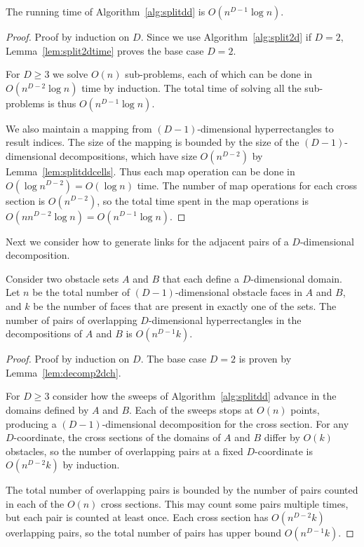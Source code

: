 \documentclass[english,gradu]{tktltiki2018}
\begin{document}
\begin{lem}\label{lem:splitddtime}The running time of Algorithm~\ref{alg:splitdd} is $O(n^{D-1}\log n)$.\end{lem}
\begin{proof}
Proof by induction on $D$.
Since we use Algorithm~\ref{alg:split2d} if $D=2$, Lemma~\ref{lem:split2dtime} proves the base case $D=2$.

For $D\ge 3$ we solve $O(n)$ sub-problems, each of which can be done in $O(n^{D-2}\log n)$ time by induction.
The total time of solving all the sub-problems is thus $O(n^{D-1}\log n)$.

We also maintain a mapping from $(D-1)$-dimensional hyperrectangles to result indices.
The size of the mapping is bounded by the size of the $(D-1)$-dimensional decompositions, which have size $O(n^{D-2})$ by Lemma~\ref{lem:splitddcells}.
Thus each map operation can be done in $O(\log{n^{D-2}})=O(\log n)$ time.
The number of map operations for each cross section is $O(n^{D-2})$, so the total time spent in the map operations is $O(nn^{D-2}\log n)=O(n^{D-1}\log n)$.
\end{proof}

Next we consider how to generate links for the adjacent pairs of a $D$-dimensional decomposition.

\begin{lem}\label{lem:decompddch}
Consider two obstacle sets $A$ and $B$ that each define a $D$-dimensional domain.
Let $n$ be the total number of $(D-1)$-dimensional obstacle faces in $A$ and $B$, and $k$ be the number of faces that are present in exactly one of the sets.
The number of pairs of overlapping $D$-dimensional hyperrectangles in the decompositions of $A$ and $B$ is $O(n^{D-1}k)$.
\end{lem}
\begin{proof}
Proof by induction on $D$.
The base case $D=2$ is proven by Lemma~\ref{lem:decomp2dch}.

For $D\ge 3$ consider how the sweeps of Algorithm~\ref{alg:splitdd} advance in the domains defined by $A$ and $B$.
Each of the sweeps stops at $O(n)$ points, producing a $(D-1)$-dimensional decomposition for the cross section.
For any $D$-coordinate, the cross sections of the domains of $A$ and $B$ differ by $O(k)$ obstacles, so the number of overlapping pairs at a fixed $D$-coordinate is $O(n^{D-2}k)$ by induction.

The total number of overlapping pairs is bounded by the number of pairs counted in each of the $O(n)$ cross sections.
This may count some pairs multiple times, but each pair is counted at least once.
Each cross section has $O(n^{D-2}k)$ overlapping pairs, so the total number of pairs has upper bound $O(n^{D-1}k)$.
\end{proof}
\end{document}
